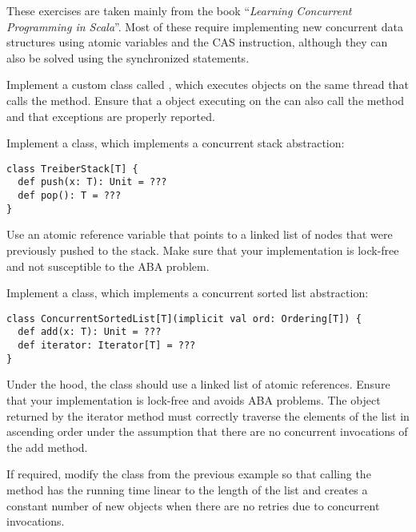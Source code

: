 \documentclass[11pt]{article}
\begin{document}
\myHeader

These exercises are taken mainly from the book ``\emph{Learning Concurrent Programming in Scala}''.
%
Most of these require implementing new concurrent data structures using atomic variables and the CAS instruction, although they can also be solved using the synchronized statements.


\begin{myExercise}
Implement a custom  class called , which executes  objects on the same thread that calls the  method. Ensure that a  object executing on the  can also call the  method and that exceptions are properly reported.
\end{myExercise}

\begin{myExercise}
Implement a  class, which implements a concurrent stack abstraction:
\begin{lstlisting}
class TreiberStack[T] {
  def push(x: T): Unit = ???
  def pop(): T = ???
}
\end{lstlisting}
Use an atomic reference variable that points to a linked list of nodes that were previously pushed to the stack. Make sure that your implementation is lock-free and not susceptible to the ABA problem.
\end{myExercise}

\begin{myExercise}
Implement a  class, which implements a concurrent sorted list abstraction:
\begin{lstlisting}
class ConcurrentSortedList[T](implicit val ord: Ordering[T]) {
  def add(x: T): Unit = ???
  def iterator: Iterator[T] = ???
}
\end{lstlisting}
Under the hood, the  class should use a linked list of atomic references. Ensure that your implementation is lock-free and avoids ABA problems.
The  object returned by the iterator method must correctly traverse the elements of the list in ascending order under the assumption that there are no concurrent invocations of the add method.
\end{myExercise}

\begin{myExercise}
If required, modify the  class from the previous example so that calling the  method has the running time linear to the length of the list and creates a constant number of new objects when there are no retries due to concurrent  invocations.
\end{myExercise}
  
\end{document}
